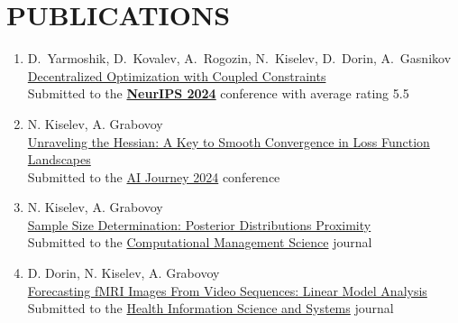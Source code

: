 \documentclass[11pt,a4paper]{moderncv}
\begin{document}


\section{PUBLICATIONS}
\begin{enumerate}
    \item D.~Yarmoshik, D.~Kovalev, A.~Rogozin, N.~Kiselev, D.~Dorin, A.~Gasnikov\\
    \href{https://arxiv.org/abs/2407.02020}{Decentralized Optimization with Coupled Constraints}\\
    Submitted to the \href{https://neurips.cc}{\textbf{NeurIPS 2024}} conference with average rating 5.5 
    \item N. Kiselev, A. Grabovoy\\
    \href{https://github.com/kisnikser/landscape-hessian}{Unraveling the Hessian: A Key to Smooth Convergence in Loss Function Landscapes}\\
    Submitted to the \href{https://aij.ru/eng}{AI Journey 2024} conference
    \item N. Kiselev, A. Grabovoy\\
    \href{https://github.com/kisnikser/Posterior-Distributions-Proximity}{Sample Size Determination: Posterior Distributions Proximity}\\
    Submitted to the \href{https://link.springer.com/journal/10287}{Computational Management Science} journal
    \item D. Dorin, N. Kiselev, A. Grabovoy\\
    \href{https://github.com/DorinDaniil/Forecasting-fMRI-Images}{Forecasting fMRI Images From Video Sequences: Linear Model Analysis}\\
    Submitted to the \href{https://link.springer.com/journal/13755}{Health Information Science and Systems} journal
\end{enumerate}
\end{document}
